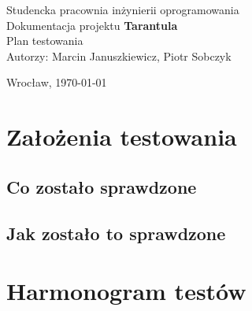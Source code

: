 \documentclass[11pt,leqno]{article}
\begin{document}
\begin{titlepage}
\begin{center}

{\Large Studencka pracownia inżynierii oprogramowania}\\[2.5cm]

{\huge Dokumentacja projektu \textbf{Tarantula}}\\[0.25cm]
{\huge Plan testowania}\\[0.5cm]

Autorzy: Marcin Januszkiewicz, Piotr Sobczyk
\vfill

{\large Wrocław, \today}

\end{center}
\end{titlepage}

\thispagestyle{empty}
\newpage
\tableofcontents
\newpage


\section{Założenia testowania}
\subsection{Co zostało sprawdzone}

\subsection{Jak zostało to sprawdzone}

\section{Harmonogram testów}
\end{document}
